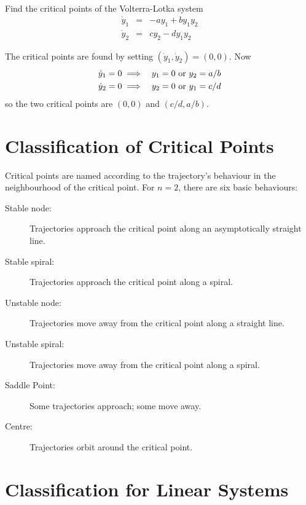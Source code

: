 \begin{example}
\label{nlc: ex vl}

\problem
Find the critical points of the Volterra-Lotka system
\begin{eqnarray*}
\dot{y}_1&=&-ay_1+by_1y_2\\
\dot{y}_2&=&cy_2-dy_1y_2
\end{eqnarray*}

\solution
The critical points are found by setting $(\dot{y}_1,\dot{y}_2)=(0,0)$.
Now
\begin{eqnarray*}
\dot{y}_1=0&\;\Longrightarrow\;& y_1=0\mbox{\ or\ }y_2=a/b\\
\dot{y}_2=0&\;\Longrightarrow\;& y_2=0\mbox{\ or\ }y_1=c/d
\end{eqnarray*}
so the two critical points are $(0,0)$ and $(c/d,a/b)$.
\end{example}


\section{Classification of Critical Points}

Critical points are named according to the trajectory's behaviour in the
neighbourhood of the critical point.  For $n=2$, there are six basic
behaviours:

\begin{description}
\item[Stable node:] Trajectories approach the critical point along an
asymptotically straight line.
\item[Stable spiral:] Trajectories approach the critical point along a
spiral.
\item[Unstable node:] Trajectories move away from the critical point along a
straight line.
\item[Unstable spiral:] Trajectories move away from the critical point 
along a spiral.
\item[Saddle Point:] Some trajectories approach; some move away.
\item[Centre:] Trajectories orbit around the critical point.
\end{description}

\section{Classification for Linear Systems}

